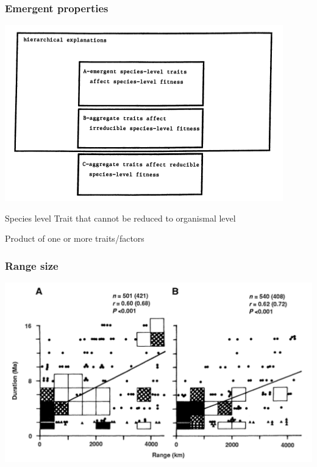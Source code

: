 \documentclass{beamer} \usepackage{amsmath,amsthm}
\begin{document}
\begin{frame}
  \frametitle{Emergent properties}

  \begin{center}
    \includegraphics[height=0.4\textheight, width=\textwidth, keepaspectratio=true]{figure/grantham}

    \tiny{}
  \end{center}

  \begin{block}{Species level}
    Trait that cannot be reduced to organismal level
    
    Product of one or more traits/factors
  \end{block}

\end{frame}

\begin{frame}
  \frametitle{Range size}
  
  \begin{center}
    \includegraphics[height = 0.8\textheight, width = \textwidth, keepaspectratio = true]{figure/range}

    \tiny{}
  \end{center}
\end{frame}
\end{document}
